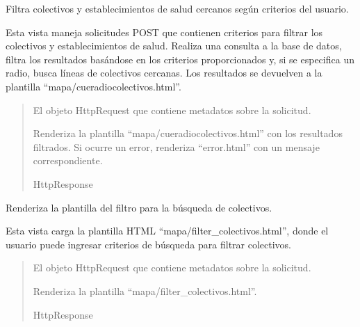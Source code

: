 \documentclass[letterpaper,10pt,spanish]{sphinxmanual}
\begin{document}
\begin{fulllineitems}

\pysigstartsignatures
{}
\pysigstopsignatures
\sphinxAtStartPar
Filtra colectivos y establecimientos de salud cercanos según criterios del usuario.

\sphinxAtStartPar
Esta vista maneja solicitudes POST que contienen criterios para filtrar los
colectivos y establecimientos de salud. Realiza una consulta a la base de datos,
filtra los resultados basándose en los criterios proporcionados y, si se especifica
un radio, busca líneas de colectivos cercanas. Los resultados se devuelven
a la plantilla “mapa/cueradiocolectivos.html”.
\begin{quote}\begin{description}
\sphinxAtStartPar
{} \textendash{} El objeto HttpRequest que contiene metadatos sobre la solicitud.

\sphinxAtStartPar
Renderiza la plantilla “mapa/cueradiocolectivos.html” con los resultados filtrados.
Si ocurre un error, renderiza “error.html” con un mensaje correspondiente.

\sphinxAtStartPar
HttpResponse

\end{description}\end{quote}

\end{fulllineitems}



\begin{fulllineitems}

\pysigstartsignatures
{}
\pysigstopsignatures
\sphinxAtStartPar
Renderiza la plantilla del filtro para la búsqueda de colectivos.

\sphinxAtStartPar
Esta vista carga la plantilla HTML “mapa/filter\_colectivos.html”, donde el usuario
puede ingresar criterios de búsqueda para filtrar colectivos.
\begin{quote}\begin{description}
\sphinxAtStartPar
{} \textendash{} El objeto HttpRequest que contiene metadatos sobre la solicitud.

\sphinxAtStartPar
Renderiza la plantilla “mapa/filter\_colectivos.html”.

\sphinxAtStartPar
HttpResponse

\end{description}\end{quote}

\end{fulllineitems}
\end{document}

